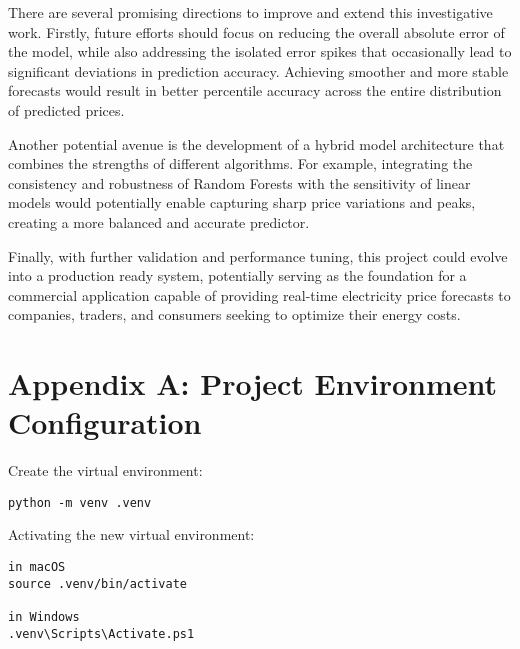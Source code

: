 \documentclass[12pt]{report} %
\begin{document}
There are several promising directions to improve and extend this investigative work. Firstly, future efforts should focus on reducing the overall absolute error of the model, while also addressing the isolated error spikes that occasionally lead to significant deviations in prediction accuracy. Achieving smoother and more stable forecasts would result in better percentile accuracy across the entire distribution of predicted prices.

Another potential avenue is the development of a hybrid model architecture that combines the strengths of different algorithms. For example, integrating the consistency and robustness of Random Forests with the sensitivity of linear models would potentially enable capturing sharp price variations and peaks, creating a more balanced and accurate predictor.

Finally, with further validation and performance tuning, this project could evolve into a production ready system, potentially serving as the foundation for a commercial application capable of providing real-time electricity price forecasts to companies, traders, and consumers seeking to optimize their energy costs.



\clearpage
{}

\printbibliography



\appendix



\chapter* {Appendix A: Project Environment Configuration}
\label{app:appendix_a_env_setup}

\noindent Create the virtual environment:
\begin{verbatim}
python -m venv .venv
\end{verbatim}

\noindent Activating the new virtual environment:
\begin{verbatim}
in macOS
source .venv/bin/activate

in Windows
.venv\Scripts\Activate.ps1
\end{verbatim}
\end{document}
